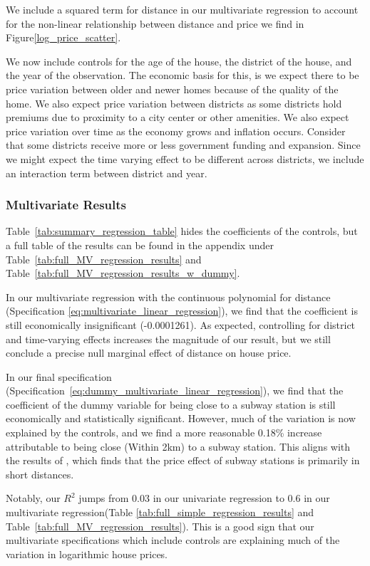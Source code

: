 We include a squared term for distance in our multivariate regression to account for the non-linear relationship between distance and price we find in Figure\ref{log_price_scatter}.

We now include controls for the age of the house, the district of the house, and the year of the observation. The economic basis for this, is we expect there to be 
price variation between older and newer homes because of the quality of the home. We also expect price variation between districts as some districts
hold premiums due to proximity to a city center or other amenities. We also expect price variation over time as the economy grows and inflation occurs.
Consider that some districts receive more or less government funding and expansion. Since we might expect the time varying effect to be different across districts, we include an interaction term between district and year.

\subsubsection{Multivariate Results}
Table~\ref{tab:summary_regression_table} hides the coefficients of the controls, but a full table of the results can be found in the appendix under Table~\ref{tab:full_MV_regression_results} and Table~\ref{tab:full_MV_regression_results_w_dummy}.

In our multivariate regression with the continuous polynomial for distance (Specification \ref{eq:multivariate_linear_regression}), we find that the coefficient is still economically insignificant (-0.0001261). As expected, controlling for district and time-varying effects increases the magnitude of our result, 
but we still conclude a precise null marginal effect of distance on house price.

In our final specification (Specification~\ref{eq:dummy_multivariate_linear_regression}),
 we find that the coefficient of the dummy variable for being close to a subway station is still economically and statistically significant. 
 However, much of the variation is now explained by the controls, and we find a more reasonable 0.18\% increase attributable to being close (Within 2km) to a subway station.
 This aligns with the results of \citet{rietveld_2007}, which finds that the price effect of subway stations is primarily in short distances.

Notably, our $R^2$ jumps from 0.03 in our univariate regression to 0.6 in our multivariate regression(Table \ref{tab:full_simple_regression_results} and Table~\ref{tab:full_MV_regression_results}).
This is a good sign that our multivariate specifications which include controls are explaining much of the variation in logarithmic house prices.

